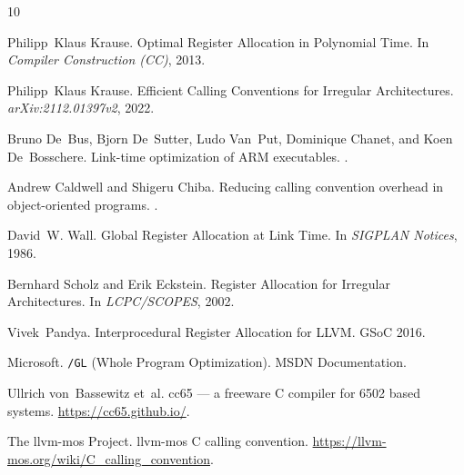 \documentclass[sigplan,screen,nonacm]{acmart}
\begin{document}
\begin{thebibliography}{10}

Philipp~Klaus Krause.
\newblock Optimal Register Allocation in Polynomial Time.
\newblock In \emph{Compiler Construction (CC)}, 2013.

Philipp~Klaus Krause.
\newblock Efficient Calling Conventions for Irregular Architectures.
\newblock \emph{arXiv:2112.01397v2}, 2022.

Bruno De~Bus, Bjorn De~Sutter, Ludo Van~Put, Dominique Chanet, and
  Koen De~Bosschere.
\newblock Link-time optimization of ARM executables.
.

Andrew Caldwell and Shigeru Chiba.
\newblock Reducing calling convention overhead in object-oriented programs.
.

David~W. Wall.
\newblock Global Register Allocation at Link Time.
\newblock In \emph{SIGPLAN Notices}, 1986.

Bernhard Scholz and Erik Eckstein.
\newblock Register Allocation for Irregular Architectures.
\newblock In \emph{LCPC/SCOPES}, 2002.

Vivek~Pandya.
\newblock Interprocedural Register Allocation for LLVM.
\newblock GSoC 2016.

Microsoft.
\newblock \texttt{/GL} (Whole Program Optimization).
\newblock MSDN Documentation.

Ullrich von~Bassewitz et~al.
\newblock cc65 --- a freeware C compiler for 6502 based systems.
\newblock \url{https://cc65.github.io/}.

The llvm-mos Project.
\newblock llvm-mos C calling convention.
\newblock \url{https://llvm-mos.org/wiki/C_calling_convention}.

\end{thebibliography}
\end{document}
